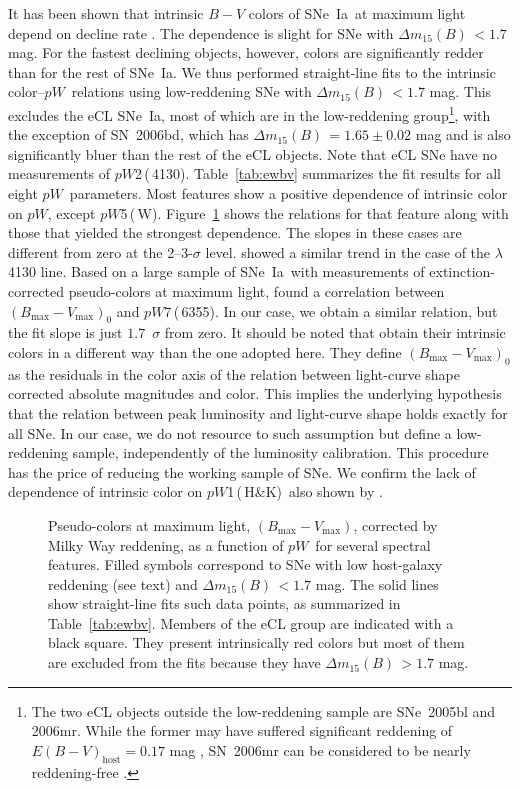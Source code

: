 \documentclass[apj]{emulateapj-rtx4}
\newcommand{\ew}{$pW$}
\newcommand{\pwone}{$pW$1\,(\ion{Ca}{2}\,H\&K)}
\newcommand{\pwtwo}{$pW$2\,(\ion{Si}{2}\,4130)}
\newcommand{\pwfive}{$pW$5\,(\ion{S}{2}\,W)}
\newcommand{\pwseven}{$pW$7\,(\ion{Si}{2}\,6355)}
\newcommand{\dm}{$\Delta m_{15}(B)$}
\newcommand{\sneia}{SNe~Ia}
\begin{document}
It has been shown that intrinsic $B-V$ colors of \sneia\ at maximum
light depend on decline rate
\citep{phillips99,altavilla04,folatelli10}. The dependence is slight
for SNe with \dm\,$<1.7$ mag. For the fastest declining objects,
however, colors are significantly redder than for the rest of \sneia. 
We thus performed straight-line fits to the intrinsic color--\ew\ relations
using low-reddening SNe with \dm\,$<1.7$ mag. This excludes the eCL
\sneia, most of which are in the low-reddening group\footnote{The two eCL
  objects outside the low-reddening sample are SNe~2005bl and
  2006mr. While the former may have suffered significant reddening of
  $E(B-V)_{\mathrm{host}}= 0.17$ mag \citep{taubenberger08}, SN~2006mr
  can be considered to be nearly reddening-free \citep{stritzinger10}.}, with the
exception of SN~2006bd, which has \dm\,$=1.65\pm0.02$ mag and is also
significantly bluer than the rest of the eCL objects. Note that eCL
SNe have no measurements of \pwtwo. Table~\ref{tab:ewbv} summarizes the fit
results for all eight \ew\ parameters. Most features show a
positive dependence of intrinsic color on \ew, except
\pwfive. Figure~\ref{fig:ewbv} shows the relations for that feature
along with those that yielded the strongest dependence. The slopes in these cases
are different from zero at the 2--3-$\sigma$ level. \citet{nordin11b}
showed a similar trend in the 
case of the  $\lambda$4130 line. Based on a large sample of
\sneia\ with measurements of extinction-corrected pseudo-colors at
maximum light, \citet{foley11b} found a correlation between
$(B_{\mathrm{max}}-V_{\mathrm{max}})_0$ and \pwseven. In our case, we
obtain a similar relation, but the fit slope is just $1.7$~$\sigma$
from zero. It should be noted that \citet{foley11b} obtain their
intrinsic colors in a different way than the one adopted here. They
define $(B_{\mathrm{max}}-V_{\mathrm{max}})_0$ as the residuals in the
color axis of the relation between light-curve shape corrected
absolute magnitudes and color. This implies the underlying hypothesis
that the relation between peak luminosity and light-curve shape holds
exactly for all SNe. In our case, we do not resource to such assumption
but define a low-reddening sample, independently of the
luminosity calibration. This procedure has the price of reducing the
working sample of SNe. We confirm the lack of dependence of intrinsic
color on \pwone\ also shown by \citet{foley11b}.

\begin{figure}[htpb]%
\caption{Pseudo-colors at maximum light, $(B_{\mathrm{max}}-V_{\mathrm{max}})$,
  corrected by Milky Way reddening, as a
  function of \ew\ for several spectral features. Filled symbols
  correspond to SNe with low host-galaxy reddening (see text) and
  \dm\,$<1.7$ mag. The solid lines show straight-line fits such data
  points, as summarized in Table~\ref{tab:ewbv}. Members of the eCL
  group are indicated with a black square. They present intrinsically
  red colors but most of them are excluded from the fits because they
  have \dm\,$>1.7$ mag.\label{fig:ewbv}}
\end{figure}
\end{document}
